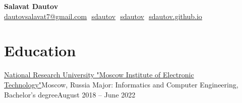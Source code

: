 \documentclass{resume}
\begin{document}
\begin{center}
  \textbf{\Large Salavat Dautov} \\
  \vspace{4pt}
  \small
  \href{mailto:dautovsalavatd@gmail.com}{\underline{dautovsalavat7@gmail.com}} $ $
  \href{https://t.me/sdautov}{\underline{sdautov}} $ $
  \href{https://github.com/sdautov}{\underline{sdautov}} $ $
  \href{https://sdautov.github.io}{\underline{sdautov.github.io}}
\end{center}

\section{Education}
\resumeSubHeadingListStart
\resumeSubheading
{\href{https://eng.miet.ru/}{National Research University "Moscow Institute of Electronic Technology"}}{Moscow, Russia}
{Major: Informatics and Computer Engineering, Bachelor’s degree}{August 2018 – June 2022}
\resumeSubHeadingListEnd

\end{document}
